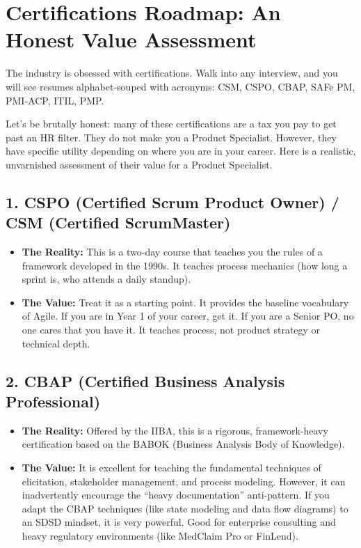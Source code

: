\documentclass[
  11pt,
  openany,
  oneside]{book}
\providecommand{\tightlist}{%
  \setlength{\itemsep}{0pt}\setlength{\parskip}{0pt}}
\begin{document}
\bigskip

\section{Certifications Roadmap: An Honest Value
Assessment}\label{certifications-roadmap-an-honest-value-assessment}

The industry is obsessed with certifications. Walk into any interview,
and you will see resumes alphabet-souped with acronyms: CSM, CSPO, CBAP,
SAFe PM, PMI-ACP, ITIL, PMP.

Let's be brutally honest: many of these certifications are a tax you pay
to get past an HR filter. They do not make you a Product Specialist.
However, they have specific utility depending on where you are in your
career. Here is a realistic, unvarnished assessment of their value for a
Product Specialist.

\subsection{1. CSPO (Certified Scrum Product Owner) / CSM (Certified
ScrumMaster)}\label{cspo-certified-scrum-product-owner-csm-certified-scrummaster}

\begin{itemize}
\tightlist
\item
  \textbf{The Reality:} This is a two-day course that teaches you the
  rules of a framework developed in the 1990s. It teaches process
  mechanics (how long a sprint is, who attends a daily standup).
\item
  \textbf{The Value:} Treat it as a starting point. It provides the
  baseline vocabulary of Agile. If you are in Year 1 of your career, get
  it. If you are a Senior PO, no one cares that you have it. It teaches
  process, not product strategy or technical depth.
\end{itemize}

\subsection{2. CBAP (Certified Business Analysis
Professional)}\label{cbap-certified-business-analysis-professional}

\begin{itemize}
\tightlist
\item
  \textbf{The Reality:} Offered by the IIBA, this is a rigorous,
  framework-heavy certification based on the BABOK (Business Analysis
  Body of Knowledge).
\item
  \textbf{The Value:} It is excellent for teaching the fundamental
  techniques of elicitation, stakeholder management, and process
  modeling. However, it can inadvertently encourage the ``heavy
  documentation'' anti-pattern. If you adapt the CBAP techniques (like
  state modeling and data flow diagrams) to an SDSD mindset, it is very
  powerful. Good for enterprise consulting and heavy regulatory
  environments (like MedClaim Pro or FinLend).
\end{itemize}
\end{document}
